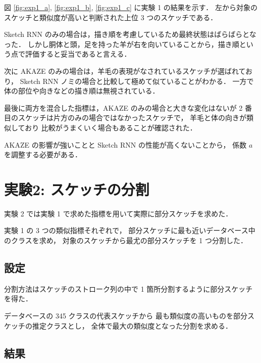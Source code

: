 \documentclass[twocolumn]{jarticle}     %
\begin{document}


図 \ref{fig:exp1_a}, \ref{fig:exp1_b}, \ref{fig:exp1_c} に実験 1 の結果を示す．
左から対象のスケッチと類似度が高いと判断された上位 3 つのスケッチである．

Sketch RNN のみの場合は，描き順を考慮しているため最終状態はばらばらとなった．
しかし胴体と頭，足を持った羊が右を向いていることから，描き順という点で評価すると妥当であると言える．

次に AKAZE のみの場合は，羊毛の表現がなされているスケッチが選ばれており，
Sketch RNN ノミの場合と比較して極めて似ていることがわかる．
一方で体の部位や向きなどの描き順は無視されている．

最後に両方を混合した指標は，AKAZE のみの場合と大きな変化はないが
 2 番目のスケッチは片方のみの場合ではなかったスケッチで，
 羊毛と体の向きが類似しており 比較がうまくいく場合もあることが確認された．

AKAZE の影響が強いことと Sketch RNN の性能が高くないことから，
係数 $a$ を調整する必要がある．


\section{実験2: スケッチの分割}
実験 2 では実験 1 で求めた指標を用いて実際に部分スケッチを求めた．

実験 1 の 3 つの類似指標それぞれで，
部分スケッチに最も近いデータベース中のクラスを求め，
対象のスケッチから最尤の部分スケッチを 1 つ分割した．

\subsection{設定}
分割方法はスケッチのストローク列の中で 1 箇所分割するように部分スケッチを得た．

データベースの 345 クラスの代表スケッチから
最も類似度の高いものを部分スケッチの推定クラスとし，
全体で最大の類似度となった分割を求める．


\subsection{結果}
\end{document}
